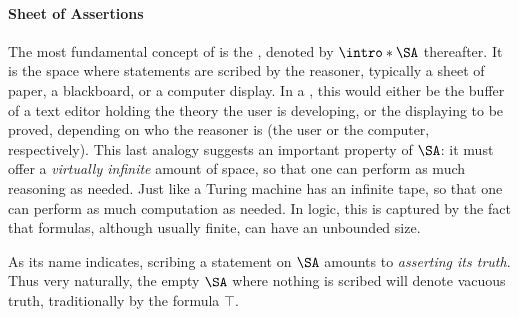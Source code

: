 \paragraph{Sheet of Assertions}

\AP
The most fundamental concept of  is the ,
denoted by $\intro*\SA$ thereafter. It is the space where statements are scribed
by the reasoner, typically a sheet of paper, a blackboard, or a computer
display. In a , this would either be the buffer of a text editor
holding the theory the user is developing, or the  displaying  to
be proved, depending on who the reasoner is (the user or the computer,
respectively). This last analogy suggests an important property of $\SA$: it
must offer a \emph{virtually infinite} amount of space, so that one can perform
as much reasoning as needed. Just like a Turing machine has an infinite tape, so
that one can perform as much computation as needed. In  logic, this is
captured by the fact that formulas, although usually finite, can have an
unbounded size.

As its name indicates, scribing a statement on $\SA$ amounts to \emph{asserting
its truth}. Thus very naturally, the empty $\SA$ where nothing is scribed will
denote vacuous truth, traditionally  by the formula $\top$.


